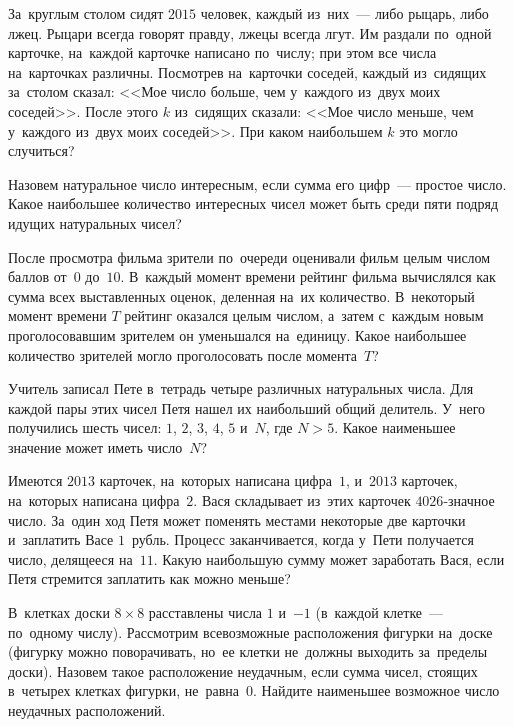 \begin{problems}
\item
За~круглым столом сидят $2015$ человек, каждый из~них~--- либо рыцарь, либо
лжец.
Рыцари всегда говорят правду, лжецы всегда лгут.
Им раздали по~одной карточке, на~каждой карточке написано по~числу;
при этом все числа на~карточках различны.
Посмотрев на~карточки соседей, каждый из~сидящих за~столом сказал:
<<Мое число больше, чем у~каждого из~двух моих соседей>>.
После этого $k$ из~сидящих сказали:
<<Мое число меньше, чем у~каждого из~двух моих соседей>>.
При каком наибольшем $k$ это могло случиться?

\item
Назовем натуральное число интересным, если сумма его цифр~--- простое число.
Какое наибольшее количество интересных чисел может быть среди пяти подряд
идущих натуральных чисел?

\item
После просмотра фильма зрители по~очереди оценивали фильм целым числом баллов
от~$0$ до~$10$.
В~каждый момент времени рейтинг фильма вычислялся как сумма всех выставленных
оценок, деленная на~их количество.
В~некоторый момент времени $T$ рейтинг оказался целым числом, а~затем с~каждым
новым проголосовавшим зрителем он уменьшался на~единицу.
Какое наибольшее количество зрителей могло проголосовать после момента~$T$?

\item
Учитель записал Пете в~тетрадь четыре различных натуральных числа.
Для каждой пары этих чисел Петя нашел их наибольший общий делитель.
У~него получились шесть чисел: $1$, $2$, $3$, $4$, $5$ и~$N$, где $N > 5$.
Какое наименьшее значение может иметь число~$N$?

\item
Имеются $2013$ карточек, на~которых написана цифра~$1$, и~$2013$ карточек,
на~которых написана цифра~$2$.
Вася складывает из~этих карточек $4026$-значное число.
За~один ход Петя может поменять местами некоторые две карточки и~заплатить Васе
$1$~рубль.
Процесс заканчивается, когда у~Пети получается число, делящееся на~$11$.
Какую наибольшую сумму может заработать Вася, если Петя стремится заплатить как
можно меньше?

\item
В~клетках доски $8 \times 8$ расставлены числа $1$ и~$-1$
(в~каждой клетке~--- по~одному числу).
Рассмотрим всевозможные расположения фигурки\enspace
{}%
\enspace
на~доске
(фигурку можно поворачивать, но~ее клетки не~должны выходить за~пределы доски).
Назовем такое расположение неудачным, если сумма чисел, стоящих в~четырех
клетках фигурки, не~равна~$0$.
Найдите наименьшее возможное число неудачных расположений.


\end{problems}
